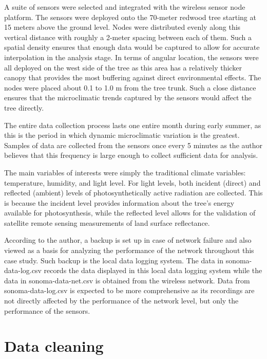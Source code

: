 \documentclass[twocolumn,11pt]{asme2ej}
\begin{document}
A suite of sensors were selected and integrated with the wireless sensor node platform. The sensors were deployed onto the 70-meter redwood tree starting at 15 meters above the ground level. Nodes were distributed evenly along this vertical distance with roughly a 2-meter spacing between each of them. Such a spatial density ensures that enough data would be captured to allow for accurate interpolation in the analysis stage. In terms of angular location, the sensors were all deployed on the west side of the tree as this area has a relatively thicker canopy that provides the most buffering against direct environmental effects. The nodes were placed about 0.1 to 1.0 m from the tree trunk. Such a close distance ensures that the microclimatic trends captured by the sensors would affect the tree directly. 

The entire data collection process lasts one entire month during early summer, as this is the period in which dynamic microclimatic variation is the greatest. Samples of data are collected from the sensors once every 5 minutes as the author believes that this frequency is large enough to collect sufficient data for analysis. 

The main variables of interests were simply the traditional climate variables: temperature, humidity, and light level. For light levels, both incident (direct) and reflected (ambient) levels of photosynthetically active radiation are collected. This is because the incident level provides information about the tree’s energy available for photosynthesis, while the reflected level allows for the validation of satellite remote sensing measurements of land surface reflectance. 

According to the author, a backup is set up in case of network failure and also viewed as a basis for analyzing the performance of the network throughout this case study. Such backup is the local data logging system. The data in sonoma-data-log.csv records the data displayed in this local data logging system while the data in sonoma-data-net.csv is obtained from the wireless network. Data from sonoma-data-log.csv is expected to be more comprehensive as its recordings are not directly affected by the performance of the network level, but only the performance of the sensors. 

\section{Data cleaning}
\end{document}
